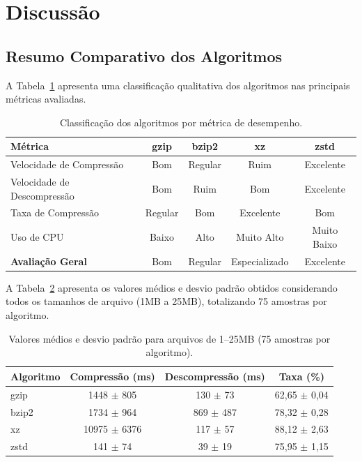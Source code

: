 \documentclass[acmsmall]{acmart}
\begin{document}
\section{Discussão}

\subsection{Resumo Comparativo dos Algoritmos}

A Tabela~\ref{tab:classificacao} apresenta uma classificação qualitativa dos algoritmos nas principais métricas avaliadas.

\begin{table}[h]
  \centering
  \caption{Classificação dos algoritmos por métrica de desempenho.}
  \label{tab:classificacao}
  \begin{tabular}{lcccc}
    \toprule
    \textbf{Métrica} & \textbf{gzip} & \textbf{bzip2} & \textbf{xz} & \textbf{zstd} \\
    \midrule
    Velocidade de Compressão & Bom & Regular & Ruim & Excelente \\
    Velocidade de Descompressão & Bom & Ruim & Bom & Excelente \\
    Taxa de Compressão & Regular & Bom & Excelente & Bom \\
    Uso de CPU & Baixo & Alto & Muito Alto & Muito Baixo \\
    \midrule
    \textbf{Avaliação Geral} & Bom & Regular & Especializado & Excelente \\
    \bottomrule
  \end{tabular}
\end{table}

A Tabela~\ref{tab:valores} apresenta os valores médios e desvio padrão obtidos considerando todos os tamanhos de arquivo (1MB a 25MB), totalizando 75 amostras por algoritmo.

\begin{table}[h]
  \centering
  \caption{Valores médios e desvio padrão para arquivos de 1--25MB (75 amostras por algoritmo).}
  \label{tab:valores}
  \begin{tabular}{lccc}
    \toprule
    \textbf{Algoritmo} & \textbf{Compressão (ms)} & \textbf{Descompressão (ms)} & \textbf{Taxa (\%)} \\
    \midrule
    gzip & 1448 $\pm$ 805 & 130 $\pm$ 73 & 62,65 $\pm$ 0,04 \\
    bzip2 & 1734 $\pm$ 964 & 869 $\pm$ 487 & 78,32 $\pm$ 0,28 \\
    xz & 10975 $\pm$ 6376 & 117 $\pm$ 57 & 88,12 $\pm$ 2,63 \\
    zstd & 141 $\pm$ 74 & 39 $\pm$ 19 & 75,95 $\pm$ 1,15 \\
    \bottomrule
  \end{tabular}
\end{table}
\end{document}
